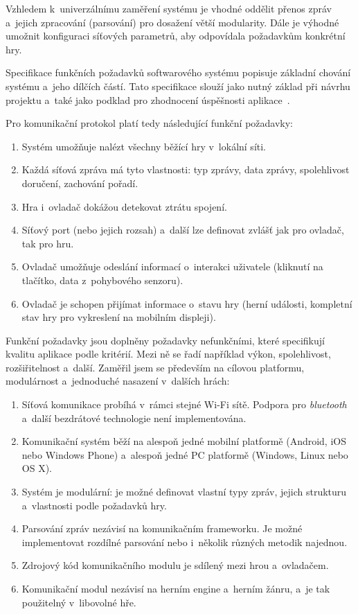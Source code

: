 \documentclass[thesis=B,czech,hidelinks]{FITthesis}[2012/06/26] %
\begin{document}
Vzhledem k~univerzálnímu zaměření systému je vhodné oddělit přenos zpráv a~jejich zpracování (parsování) pro dosažení větší modularity. Dále je výhodné umožnit  konfiguraci síťových parametrů, aby odpovídala požadavkům konkrétní hry.

Specifikace funkčních požadavků softwarového systému popisuje základní chování systému a~jeho dílčích částí. Tato specifikace slouží jako nutný základ při návrhu projektu a~také jako podklad pro zhodnocení úspěšnosti aplikace~\cite{pozadavky}.

Pro komunikační protokol platí tedy následující funkční požadavky:

\begin{enumerate}
	\item Systém umožňuje nalézt všechny běžící hry v~lokální síti.
	\item Každá síťová zpráva má tyto vlastnosti: typ zprávy, data zprávy, spolehlivost doručení, zachování pořadí.
	\item Hra i~ovladač dokážou detekovat ztrátu spojení.
	\item Síťový port (nebo jejich rozsah) a~další lze definovat zvlášť jak pro ovladač, tak pro hru.
	\item Ovladač umožňuje odeslání informací o~interakci uživatele (kliknutí na tlačítko, data z~pohybového senzoru).
	\item Ovladač je schopen přijímat informace o~stavu hry (herní události, kompletní stav hry pro vykreslení na mobilním displeji).
\end{enumerate}

Funkční požadavky jsou doplněny požadavky nefunkčními, které specifikují kvalitu aplikace podle kritérií. Mezi ně se řadí například výkon, spolehlivost, rozšiřitelnost a~další. Zaměřil jsem se především na cílovou platformu, modulárnost a~jednoduché nasazení v~dalších hrách:

\begin{enumerate}
	\item Síťová komunikace probíhá v~rámci stejné Wi-Fi sítě. Podpora pro \textit{blue\-tooth} a~další bezdrátové technologie není implementována.
	\item Komunikační systém běží na alespoň jedné mobilní platformě (Android, iOS nebo Windows Phone) a~alespoň jedné PC platformě (Windows, Linux nebo OS X).
	\item Systém je modulární: je možné definovat vlastní typy zpráv, jejich strukturu a~vlastnosti podle požadavků hry.
	\item Parsování zpráv nezávisí na komunikačním frameworku. Je možné implementovat rozdílné parsování nebo i~několik různých metodik najednou.
	\item Zdrojový kód komunikačního modulu je sdílený mezi hrou a~ovladačem.
	\item Komunikační modul nezávisí na herním engine a~herním žánru, a~je tak použitelný v~libovolné hře.
\end{enumerate}
\end{document}
